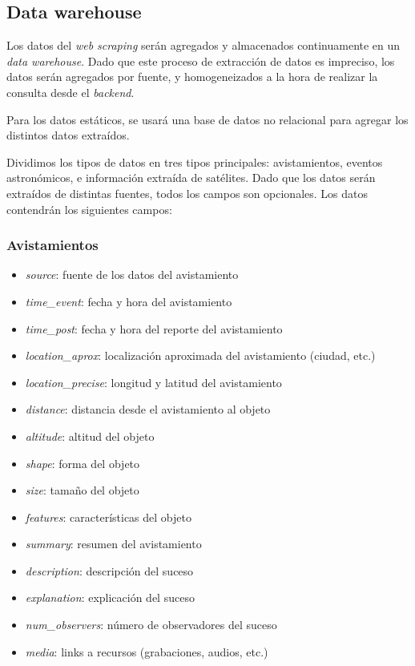 \subsection{Data warehouse}\label{subsec:data-warehouse}
Los datos del \textit{web scraping} serán agregados y almacenados continuamente
en un \textit{data warehouse}. Dado que este proceso de extracción de datos es
impreciso, los datos serán agregados por fuente, y homogeneizados a la hora de
realizar la consulta desde el \textit{backend}.

Para los datos estáticos, se usará una base de datos no relacional para agregar
los distintos datos extraídos.

Dividimos los tipos de datos en tres tipos principales: avistamientos, eventos astronómicos, e información extraída de satélites. Dado que los datos serán extraídos de distintas fuentes, todos los campos son opcionales. Los datos contendrán los siguientes campos:

\subsubsection*{Avistamientos}
\begin{itemize}
  \item \textit{source}: fuente de los datos del avistamiento
  \item \textit{time\_event}: fecha y hora del avistamiento
  \item \textit{time\_post}: fecha y hora del reporte del avistamiento
  \item \textit{location\_aprox}: localización aproximada del avistamiento (ciudad, etc.)
  \item \textit{location\_precise}: longitud y latitud del avistamiento
  \item \textit{distance}: distancia desde el avistamiento al objeto
  \item \textit{altitude}: altitud del objeto
  \item \textit{shape}: forma del objeto
  \item \textit{size}: tamaño del objeto
  \item \textit{features}: características del objeto
  \item \textit{summary}: resumen del avistamiento
  \item \textit{description}: descripción del suceso
  \item \textit{explanation}: explicación del suceso
  \item \textit{num\_observers}: número de observadores del suceso
  \item \textit{media}: links a recursos (grabaciones, audios, etc.)
\end{itemize}


